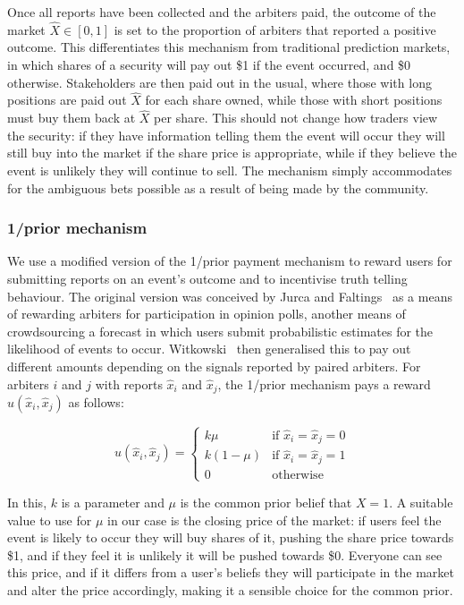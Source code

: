 Once all reports have been collected and the arbiters paid, the outcome of the
market $\hat{X} \in [0,1]$ is set to the proportion of arbiters that reported a
positive outcome. This differentiates this mechanism from traditional
prediction markets, in which shares of a security will pay out \$1 if the event
occurred, and \$0 otherwise. Stakeholders are then paid out in the usual, where
those with long positions are paid out $\hat{X}$ for each share owned, while
those with short positions must buy them back at $\hat{X}$ per share. This
should not change how traders view the security: if they have information
telling them the event will occur they will still buy into the market if the
share price is appropriate, while if they believe the event is unlikely they
will continue to sell. The mechanism simply accommodates for the ambiguous bets
possible as a result of being made by the community.

\subsubsection{1/prior mechanism}

We use a modified version of the 1/prior payment mechanism to reward users for
submitting reports on an event's outcome and to incentivise truth telling
behaviour. The original version was conceived by Jurca and
Faltings~\cite{JurcaFaltings2008, JurcaFaltings2011} as a means of rewarding
arbiters for participation in opinion polls, another means of crowdsourcing a
forecast in which users submit probabilistic estimates for the likelihood of
events to occur. Witkowski~\cite{Witkowski2014} then generalised this to pay
out different amounts depending on the signals reported by paired arbiters. For
arbiters $i$ and $j$ with reports $\hat{x}_i$ and $\hat{x}_j$, the 1/prior
mechanism pays a reward $u(\hat{x}_i, \hat{x}_j)$ as follows:

\begin{equation}
	\label{eq:oneOverPrior}
	u(\hat{x}_i, \hat{x}_j) =
	\begin{cases}
		k \mu & \text{if } \hat{x}_i = \hat{x}_j = 0 \\
		k (1-\mu) & \text{if } \hat{x}_i = \hat{x}_j = 1 \\
		0 & \text{otherwise}
	\end{cases}
\end{equation}

In this, $k$ is a parameter and $\mu$ is the common prior belief that $X=1$. A
suitable value to use for $\mu$ in our case is the closing price of the market:
if users feel the event is likely to occur they will buy shares of it, pushing
the share price towards \$1, and if they feel it is unlikely it will be pushed
towards \$0. Everyone can see this price, and if it differs from a user's
beliefs they will participate in the market and alter the price accordingly,
making it a sensible choice for the common prior.

